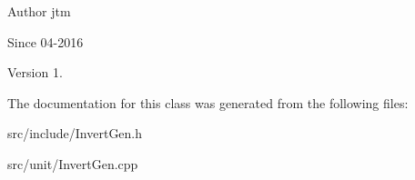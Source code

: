 \begin{DoxyAuthor}{Author}
jtm 
\end{DoxyAuthor}
\begin{DoxySince}{Since}
04-\/2016 
\end{DoxySince}
\begin{DoxyVersion}{Version}
1. 
\end{DoxyVersion}


The documentation for this class was generated from the following files\-:\begin{DoxyCompactItemize}
\item 
src/include/Invert\-Gen.\-h\item 
src/unit/Invert\-Gen.\-cpp\end{DoxyCompactItemize}

